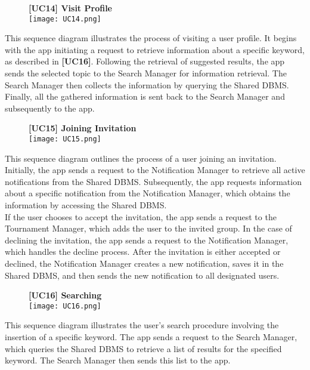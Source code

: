 \documentclass{article}
\begin{document}
\begin{figure}[H]
    \centering
    \textbf{[UC14] Visit Profile} \\
    \texttt{[image: UC14.png]}
\end{figure}
\noindent
This sequence diagram illustrates the process of visiting a user profile. It begins with the app initiating a request to retrieve information about a specific keyword, as described in \textbf{[UC16]}. Following the retrieval of suggested results, the app sends the selected topic to the Search Manager for information retrieval. The Search Manager then collects the information by querying the Shared DBMS. Finally, all the gathered information is sent back to the Search Manager and subsequently to the app.

\begin{figure}[H]
    \centering
    \textbf{[UC15] Joining Invitation} \\
    \texttt{[image: UC15.png]}
\end{figure}
\noindent
This sequence diagram outlines the process of a user joining an invitation. Initially, the app sends a request to the Notification Manager to retrieve all active notifications from the Shared DBMS. Subsequently, the app requests information about a specific notification from the Notification Manager, which obtains the information by accessing the Shared DBMS. \\
If the user chooses to accept the invitation, the app sends a request to the Tournament Manager, which adds the user to the invited group. In the case of declining the invitation, the app sends a request to the Notification Manager, which handles the decline process. After the invitation is either accepted or declined, the Notification Manager creates a new notification, saves it in the Shared DBMS, and then sends the new notification to all designated users.

\begin{figure}[H]
    \centering
    \textbf{[UC16] Searching} \\
    \texttt{[image: UC16.png]}
\end{figure}
\noindent
This sequence diagram illustrates the user's search procedure involving the insertion of a specific keyword. The app sends a request to the Search Manager, which queries the Shared DBMS to retrieve a list of results for the specified keyword. The Search Manager then sends this list to the app.
\end{document}
